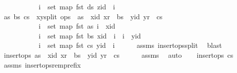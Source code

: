 \begin{isabellebody}
\ \ \ \ \ \ \ \ \ \ \ {\isacharparenleft}{\isasymforall}i\ {\isasymin}\ set\ {\isacharparenleft}map\ fst\ ds{\isacharparenright}{\isachardot}\ zid\ {\isacharless}\ i{\isacharparenright}{\isachardoublequoteclose}\isanewline
%
\isadelimproof
%
\endisadelimproof
%
\isatagproof
{}\isamarkupfalse%
\ {\isacharminus}\isanewline
\ \ \isamarkupfalse%
\ as\ bs\ cs{}\ \ xy{\isacharunderscore}split{\isacharcolon}\ {\isachardoublequoteopen}ops\ {\isacharequal}\ as\ {\isacharat}\ {\isacharbrackleft}{\isacharparenleft}xid{\isacharcomma}\ xr{\isacharparenright}{\isacharbrackright}\ {\isacharat}\ bs\ {\isacharat}\ {\isacharbrackleft}{\isacharparenleft}yid{\isacharcomma}\ yr{\isacharparenright}{\isacharbrackright}\ {\isacharat}\ cs{}\ {\isasymand}\isanewline
\ \ \ \ \ \ \ \ \ \ \ {\isacharparenleft}{\isasymforall}i\ {\isasymin}\ set\ {\isacharparenleft}map\ fst\ as{\isacharparenright}{\isachardot}\ i\ {\isacharless}\ xid{\isacharparenright}\ {\isasymand}\isanewline
\ \ \ \ \ \ \ \ \ \ \ {\isacharparenleft}{\isasymforall}i\ {\isasymin}\ set\ {\isacharparenleft}map\ fst\ bs{\isacharparenright}{\isachardot}\ xid\ {\isacharless}\ i\ {\isasymand}\ i\ {\isacharless}\ yid{\isacharparenright}\ {\isasymand}\isanewline
\ \ \ \ \ \ \ \ \ \ \ {\isacharparenleft}{\isasymforall}i\ {\isasymin}\ set\ {\isacharparenleft}map\ fst\ cs{}{\isacharparenright}{\isachardot}\ yid\ {\isacharless}\ i{\isacharparenright}{\isachardoublequoteclose}\isanewline
\ \ \ \ \isamarkupfalse%
\ assms\ insert{\isacharunderscore}ops{\isacharunderscore}split{\isacharunderscore}{}\ \isamarkupfalse%
\ blast\isanewline
\ \ \isamarkupfalse%
\ {\isachardoublequoteopen}insert{\isacharunderscore}ops\ {\isacharparenleft}{\isacharparenleft}as\ {\isacharat}\ {\isacharbrackleft}{\isacharparenleft}xid{\isacharcomma}\ xr{\isacharparenright}{\isacharbrackright}\ {\isacharat}\ bs\ {\isacharat}\ {\isacharbrackleft}{\isacharparenleft}yid{\isacharcomma}\ yr{\isacharparenright}{\isacharbrackright}{\isacharparenright}\ {\isacharat}\ cs{}{\isacharparenright}{\isachardoublequoteclose}\isanewline
\ \ \ \ \isamarkupfalse%
\ assms{\isacharparenleft}{}{\isacharparenright}\ \isamarkupfalse%
\ auto\isanewline
\ \ \isamarkupfalse%
\ {\isachardoublequoteopen}insert{\isacharunderscore}ops\ cs{}{\isachardoublequoteclose}\isanewline
\ \ \ \ \isamarkupfalse%
\ assms{\isacharparenleft}{}{\isacharparenright}\ insert{\isacharunderscore}ops{\isacharunderscore}rem{\isacharunderscore}prefix\ \isamarkupfalse%

\end{isabellebody}
